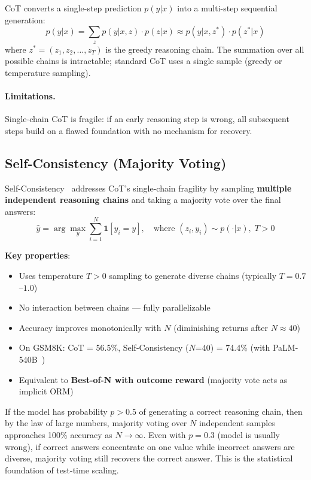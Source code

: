 CoT converts a single-step prediction $p(y|x)$ into a multi-step sequential generation: 
\begin{equation}
p(y|x) = \sum_{z} p(y|x, z) \cdot p(z|x) \approx p(y|x, z^*) \cdot p(z^*|x)
\end{equation}
 where $z^* = (z_1, z_2, \ldots, z_T)$ is the greedy reasoning chain. The summation over all possible chains is intractable; standard CoT uses a single sample (greedy or temperature sampling).

\paragraph{Limitations.}
\label{limitations.}

Single-chain CoT is fragile: if an early reasoning step is wrong, all subsequent steps build on a flawed foundation with no mechanism for recovery.

\subsection{Self-Consistency (Majority Voting)}
\label{self-consistency-majority-voting}

Self-Consistency~\cite{wang2023selfconsistency} addresses CoT’s single-chain fragility by sampling \textbf{multiple independent reasoning chains} and taking a majority vote over the final answers: 
\begin{equation}
\hat{y} = \arg\max_{y} \sum_{i=1}^{N} \mathbf{1}[y_i = y], \quad \text{where } (z_i, y_i) \sim p(\cdot | x), \; T > 0
\end{equation}

\textbf{Key properties}:

\begin{itemize}
  \item Uses temperature $T > 0$ sampling to generate diverse chains (typically $T = 0.7$--$1.0$)
  \item No interaction between chains --- fully parallelizable
  \item Accuracy improves monotonically with $N$ (diminishing returns after $N \approx 40$)
  \item On GSM8K: CoT = 56.5\%, Self-Consistency ($N$=40) = 74.4\% (with PaLM-540B~\cite{chowdhery2022palm})
  \item Equivalent to \textbf{Best-of-N with outcome reward} (majority vote acts as implicit ORM)
\end{itemize}

\begin{intuitionbox}
If the model has probability $p > 0.5$ of generating a correct reasoning chain, then by the law of large numbers, majority voting over $N$ independent samples approaches 100\% accuracy as $N \to \infty$. Even with $p = 0.3$ (model is usually wrong), if correct answers concentrate on one value while incorrect answers are diverse, majority voting still recovers the correct answer. This is the statistical foundation of test-time scaling.
\end{intuitionbox}

